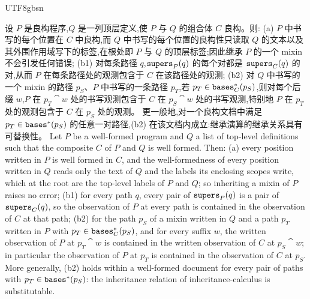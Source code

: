 \begin{CJK*}{UTF8}{gbsn}
\begin{theorem}\label{thm:inheritance-substitutability}
\ifPaperChinese
设 $P$ 是良构程序,$Q$ 是一列顶层定义,使 $P$ 与 $Q$ 的组合体 $C$ 良构。则:
(a) $P$ 中书写的每个位置在 $C$ 中良构,而 $Q$ 中书写的每个位置的良构性只读取 $Q$ 的文本以及其外围作用域写下的标签,在根处即 $P$ 与 $Q$ 的顶层标签;因此继承 $P$ 的一个 mixin 不会引发任何错误;
(b1) 对每条路径 $q$,$\mathtt{supers}_P(q)$ 的每个对都是 $\mathtt{supers}_C(q)$ 的对,从而 $P$ 在每条路径处的观测包含于 $C$ 在该路径处的观测;
(b2) 对 $Q$ 中书写的一个 mixin 的路径 $p_S$、$P$ 中书写的一条路径 $p_T$,若 $p_T \in \mathtt{bases}^*_C(p_S)$,则对每个后缀 $w$,$P$ 在 $p_T \cat w$ 处的书写观测包含于 $C$ 在 $p_S \cat w$ 处的书写观测,特别地 $P$ 在 $p_T$ 处的观测包含于 $C$ 在 $p_S$ 处的观测。
更一般地,对一个良构文档中满足 $p_T \in \mathtt{bases}^*(p_S)$ 的任意一对路径,(b2) 在该文档内成立:继承演算的继承关系具有可替换性。
\else
Let $P$ be a well-formed program and $Q$ a list of top-level definitions such that the composite $C$ of
$P$ and $Q$ is well formed. Then:
(a) every position written in $P$ is well formed in $C$, and the well-formedness of every position
written in $Q$ reads only the text of $Q$ and the labels its enclosing scopes write, which at the root
are the top-level labels of $P$ and $Q$; so inheriting a mixin of $P$ raises no error;
(b1) for every path $q$, every pair of $\mathtt{supers}_P(q)$ is a pair of $\mathtt{supers}_C(q)$, so the observation of
$P$ at every path is contained in the observation of $C$ at that path;
(b2) for the path $p_S$ of a mixin written in $Q$ and a path $p_T$ written in $P$ with
$p_T \in \mathtt{bases}^*_C(p_S)$, and for every suffix $w$, the written observation of $P$ at $p_T \cat w$ is
contained in the written observation of $C$ at $p_S \cat w$; in particular the observation of $P$ at
$p_T$ is contained in the observation of $C$ at $p_S$.
More generally, (b2) holds within a well-formed document for every pair of paths with
$p_T \in \mathtt{bases}^*(p_S)$: the inheritance relation of inheritance-calculus is substitutable.
\fi
\end{theorem}


\end{CJK*}

